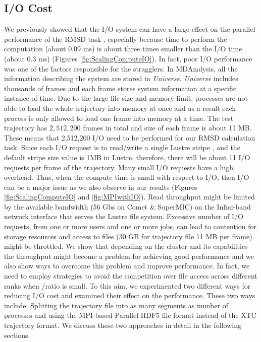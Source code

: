 \subsection{I/O Cost}
\label{I/O}
We previously showed that the I/O system can have a large effect on the parallel performance of the RMSD task \cite{Khoshlessan:2017ab},
especially because time to perform the computation \tcomp (about 0.09 ms) is about three times smaller than the I/O time \tIO (about 0.3 ms) (Figures \ref{fig:ScalingComputeIO}). 
In fact, poor I/O performance was one of the factors responsible for the stragglers. 
In MDAnalysis, all the information describing the system are stored in \emph{Universe}.
\emph{Universe} includes thousands of frames and each frame stores system information at a specific instance of time.
Due to the large file size and memory limit, processes are not able to load the whole trajectory into memory at once and as a result each process is only allowed to load one frame into memory at a time.
The test trajectory has $2,512,200$ frames in total and size of each frame is about 11 MB.
These means that 2,512,200 I/O need to be performed for our RMSD calculation task.
Since each I/O request is to read/write a single Lustre stripe \cite{optimize_lustre}, and the default stripe size value is 1MB in Lustre, therefore, there will be about 11 I/O requests per frame of the trajectory.
Many small I/O requests have a high overhead. 
Thus, when the compute time is small with respect to I/O, then I/O can be a major issue as we also observe in our results (Figures \ref{fig:ScalingComputeIO} and \ref{fig:MPIwithIO}).    
Read throughput might be limited by the available bandwidth (56 Gbs on Comet \& SuperMIC) on the Infini-band network interface that serves the Lustre file system.
Excessive number of I/O requests, from one or more users and one or more jobs, can lead to contention for storage resources and access to files (30 GB for trajectory file 11 MB per frame) might be throttled.
We show that depending on the cluster and its capabilities the throughput might become a problem for achieving good performance and we also show ways to overcome this problem and improve performance.
In fact, we need to employ strategies to avoid the competition over file access across different ranks when \tcomp/\tIO ratio is small.
To this aim, we experimented two different ways for reducing I/O cost and examined their effect on the performance.
These two ways include: Splitting the trajectory file into as many segments as number of processes and using the MPI-based Parallel HDF5 file format instead of the XTC trajectory format.
We discuss these two approaches in detail in the following sections.

